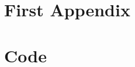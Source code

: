 \documentclass{juniorlabs}
\begin{document}
    \appendix


    \section{First Appendix} \label{sec:-first-appendix}


    \section{Code} \label{sec:minted-code}
    \inputminted[linenos, bgcolor=LightGray, fontsize=\footnotesize]{python}{EXAMPLE_Code.py}


    
    
\end{document}
